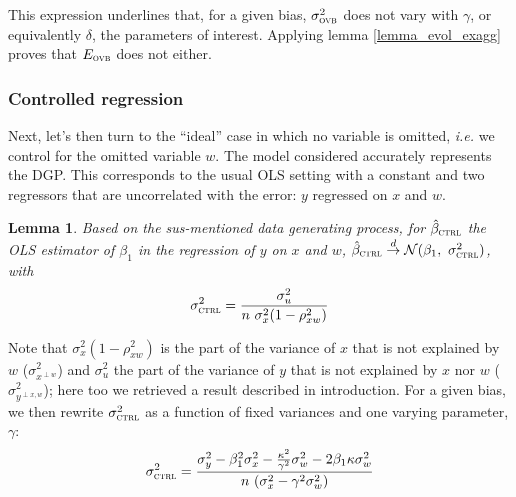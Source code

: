 \documentclass[usletter, 12pt]{article}
\newtheorem{lemma}{Lemma}
\begin{document}
			 This expression underlines that, for a given bias,  $\sigma_{\textsc{ovb}}^{2}$ does not vary with $\gamma$, or equivalently $\delta$, the parameters of interest. Applying lemma \ref{lemma_evol_exagg} proves that $E_{\textsc{ovb}}$ does not either.

			
			\subsubsection{Controlled regression}
			
				Next, let's then turn to the ``ideal'' case in which no variable is omitted, \textit{i.e.} we control for the omitted variable $w$. The model considered accurately represents the DGP.
%				
				This corresponds to the usual OLS setting with a constant and two regressors that are uncorrelated with the error: $y$ regressed on $x$ and $w$.
						
				\begin{lemma}\label{lemma_ctrl}
					Based on the sus-mentioned data generating process, for $\hat{\beta}_{\textsc{ctrl}}$ the OLS estimator of $\beta_{1}$ in the regression of $y$ on $x$ and $w$, $\hat{\beta}_{\textsc{ctrl}} \overset{d}{\to} \mathcal{N}(\beta_{1}, \ \sigma_{\textsc{ctrl}}^{2})$, with
					\[
						\sigma_{\textsc{ctrl}}^{2} = \dfrac{\sigma_{u}^{2}}{n \ \sigma_{x}^{2} (1 - \rho_{xw}^{2})}
					\]
				\end{lemma}
				
				Note that $\sigma_{x}^{2} (1 - \rho_{xw}^{2})$ is the part of the variance of $x$ that is not explained by $w$ ($\sigma^{2}_{x^{\perp w}}$) and $\sigma_{u}^{2}$ the part of the variance of $y$ that is not explained by $x$ nor $w$ ($\sigma^{2}_{y^{\perp x, w}}$); here too we retrieved a result described in introduction. For a given bias, we then rewrite $\sigma_{\textsc{ctrl}}^{2}$ as a function of fixed variances and one varying parameter, $\gamma$:
				~
				\[
					\sigma_{\textsc{ctrl}}^{2} = \dfrac{\sigma_{y}^{2} - \beta_{1}^{2}\sigma_{x}^{2} - \frac{\kappa^{2}}{\gamma^{2}}\sigma_{w}^{2} - 2\beta_{1}\kappa \sigma_{w}^{2}}{n \ (\sigma_{x}^{2}  - \gamma^{2} \sigma_{w}^{2})}
				\]
				
\end{document}
